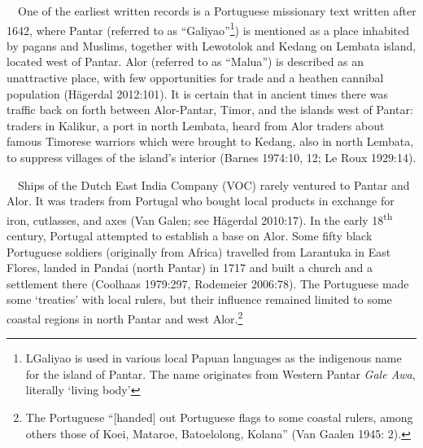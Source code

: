\ \ One of the earliest written records is a Portuguese missionary text written after 1642, where Pantar (referred to as {\textquotedblleft}Galiyao{\textquotedblright}\footnote{LGaliyao is used in various local Papuan languages as the indigenous name for the island of Pantar. The name originates from Western Pantar \textit{Gale Awa}, literally {\textquoteleft}living body{\textquoteright}}) is mentioned as a place inhabited by pagans and Muslims, together with Lewotolok and Kedang on Lembata island, located west of Pantar. Alor (referred to as {\textquotedblleft}Malua{\textquotedblright}) is described as an unattractive place, with few opportunities for trade and a heathen cannibal population (H\"agerdal 2012:101). It is certain that in ancient times there was traffic back on forth between Alor-Pantar, Timor, and the islands west of Pantar: traders in  Kalikur, a port in north Lembata, heard from Alor traders about famous Timorese warriors which were brought to Kedang, also in north Lembata, to suppress villages of the island{\textquoteright}s interior (Barnes 1974:10, 12; Le Roux 1929:14). 

\ \ Ships of the Dutch East India Company (VOC) rarely ventured to Pantar and Alor. It was traders from Portugal who bought local products in exchange for iron, cutlasses, and axes (Van Galen; see H\"agerdal 2010:17). In the early 18\textsuperscript{th} century, Portugal attempted to establish a base on Alor. Some fifty black Portuguese soldiers (originally from Africa) travelled from Larantuka in East Flores, landed in Pandai (north Pantar) in 1717 and built a church and a settlement there (Coolhaas 1979:297, Rodemeier 2006:78). The Portuguese made some {\textquoteleft}treaties{\textquoteright} with local rulers, but their influence remained limited to some coastal regions in north Pantar and west Alor.\footnote{The Portuguese {\textquotedblleft}[handed] out Portuguese flags to some coastal rulers, among others those of Koei, Mataroe, Batoelolong, Kolana{\textquotedblright} (Van Gaalen 1945: 2).} 

